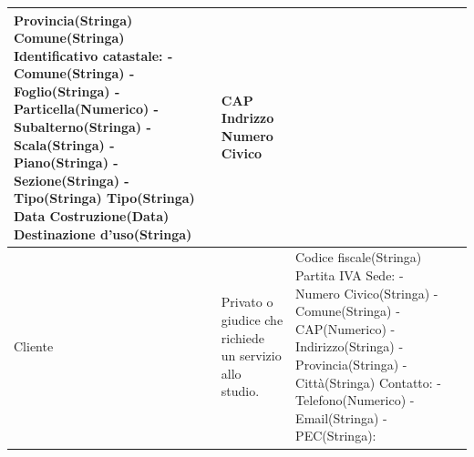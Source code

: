 \documentclass{elegantbook}
\begin{document}
\begin{longtable}{|p{2cm}|p{4.6cm}|p{6.2cm}|p{3.2cm}|}
		\newline Provincia(Stringa) 
		\newline Comune(Stringa) 
		\newline Identificativo catastale:
                \newline -Comune(Stringa)
                \newline -Foglio(Stringa)
                \newline -Particella(Numerico)
                \newline -Subalterno(Stringa)
                \newline -Scala(Stringa)
                \newline -Piano(Stringa)
                \newline -Sezione(Stringa)
                \newline -Tipo(Stringa)
                \newline Tipo(Stringa)
		\newline Data Costruzione(Data) 
		\newline Destinazione d'uso(Stringa)
		& CAP 
		\newline Indrizzo 
		\newline Numero Civico\\
            \hline
            Cliente 
		& Privato o giudice che richiede un servizio allo studio. 
		& Codice fiscale(Stringa) 
                \newline Partita IVA
                \newline Sede:
		\newline -Numero Civico(Stringa) 
		\newline -Comune(Stringa) 
		\newline -CAP(Numerico) 
		\newline -Indirizzo(Stringa) 
		\newline -Provincia(Stringa) 
		\newline -Città(Stringa) 
                \newline Contatto:
                \newline -Telefono(Numerico)
                \newline -Email(Stringa)
                \newline -PEC(Stringa):
                

\end{longtable}
\end{document}
